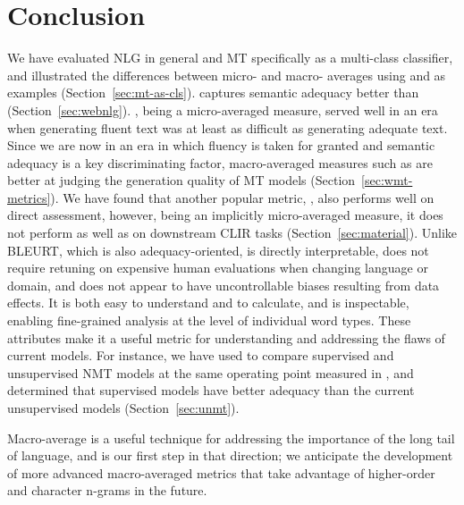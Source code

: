 \section{Conclusion}
We have evaluated NLG in general and MT specifically as a multi-class classifier, and illustrated the differences between micro- and macro- averages using  and  as examples (Section~\ref{sec:mt-as-cls}).
 captures semantic adequacy better than  (Section~\ref{sec:webnlg}).
\bleu, being a micro-averaged measure, served well in an era when generating fluent text was at least as difficult as generating adequate text. Since we are now in an era in which fluency is taken for granted and semantic adequacy is a key discriminating factor, macro-averaged measures such as  are better at judging the generation quality of MT models (Section~\ref{sec:wmt-metrics}).
We have found that another popular metric, , also performs well on direct assessment,
however, being an implicitly micro-averaged measure, it does not perform as well as  on downstream CLIR tasks (Section~\ref{sec:material}).
Unlike BLEURT, which is also adequacy-oriented,  is directly interpretable, does not require retuning on expensive human evaluations when changing language or domain, and does not appear to have uncontrollable biases resulting from data effects.
It is both easy to understand and to calculate, and is  
inspectable, enabling fine-grained analysis at the level of individual word types. These attributes make it a useful metric for understanding and addressing the flaws of current models. For instance, we have used  to compare supervised and unsupervised NMT models at the same operating point measured in \bleu, and determined that supervised models have better adequacy than the current unsupervised models (Section~\ref{sec:unmt}).

Macro-average is a useful technique for addressing the importance of the long tail of language, and  is our first step in that direction; we anticipate the development of more advanced macro-averaged metrics that take advantage of higher-order and character n-grams in the future. 




